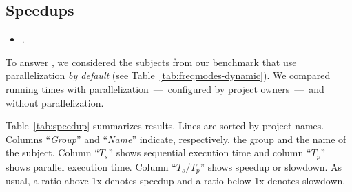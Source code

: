 \begin{center}
\end{center}

\subsection{Speedups}
\label{sec:rqD}

\begin{itemize}
    \item \numRQSpeedupOne{}. \textbf{\RQSpeedupOne}
\end{itemize}

To answer \numRQSpeedupOne{}, we considered the \numProjectsPar{}
subjects from our benchmark that use parallelization \emph{by default}
(see Table~\ref{tab:freqmodes-dynamic}).  We compared running times
with parallelization~---~configured by project owners~---~and without
parallelization.


Table~\ref{tab:speedup} summarizes results.  Lines are sorted by
project names.  Columns ``\emph{Group}'' and
``\emph{Name}'' indicate, respectively, the group and the name of the
subject.  Column ``$T_s$'' shows sequential execution time and column
``$T_p$'' shows parallel execution time. Column ``$T_s/T_p$'' shows
speedup or slowdown.  As usual, a ratio above 1x denotes speedup
and a ratio below 1x denotes slowdown.

